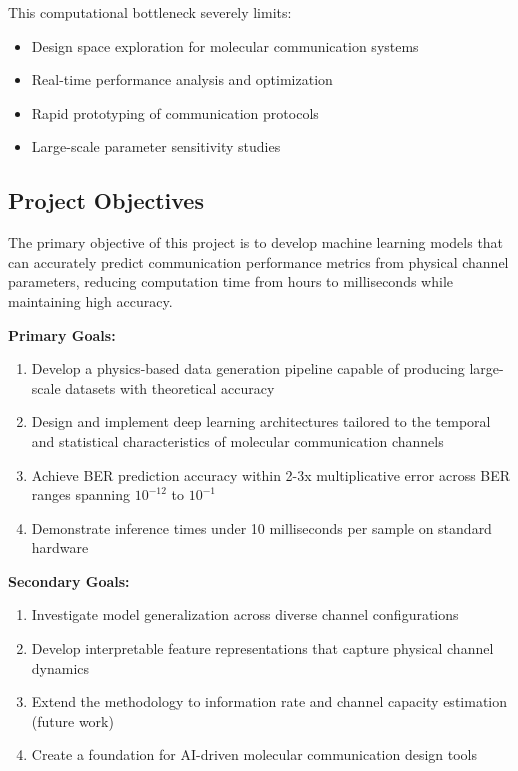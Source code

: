 \documentclass[a4paper,12pt]{report}
\begin{document}
This computational bottleneck severely limits:
\begin{itemize}
    \item Design space exploration for molecular communication systems
    \item Real-time performance analysis and optimization
    \item Rapid prototyping of communication protocols
    \item Large-scale parameter sensitivity studies
\end{itemize}

\subsection{Project Objectives}

The primary objective of this project is to develop machine learning models that can accurately predict communication performance metrics from physical channel parameters, reducing computation time from hours to milliseconds while maintaining high accuracy.

\textbf{Primary Goals:}
\begin{enumerate}
    \item Develop a physics-based data generation pipeline capable of producing large-scale datasets with theoretical accuracy
    \item Design and implement deep learning architectures tailored to the temporal and statistical characteristics of molecular communication channels
    \item Achieve BER prediction accuracy within 2-3x multiplicative error across BER ranges spanning $10^{-12}$ to $10^{-1}$
    \item Demonstrate inference times under 10 milliseconds per sample on standard hardware
\end{enumerate}

\textbf{Secondary Goals:}
\begin{enumerate}
    \item Investigate model generalization across diverse channel configurations
    \item Develop interpretable feature representations that capture physical channel dynamics
    \item Extend the methodology to information rate and channel capacity estimation (future work)
    \item Create a foundation for AI-driven molecular communication design tools
\end{enumerate}
\end{document}
